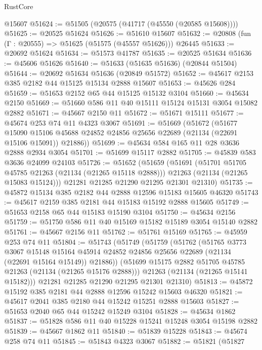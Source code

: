 \begin{lexlean}{RustCore}
\begin{coremodule}
    @15607
@51624 := @51505 (@20575 (@41717 (@45550 (@20585 @15608))))
@51625 := @20525 @51624
@51626 := @51610 @15607
@51632 := @20808 (fun (Γ : @20555) => @51625 (@51575 (@45557 @51626))) @26445
@51633 := @20692 @51624
@51634 := @51573 @41787
@51635 := @20525 @51634
@51636 := @45606 @51626
@51640 := @51633 (@51635 @51636) (@20844 @51504)
@51644 := @20692 @51634 @51636 (@20849 @51572)
@51652 := @45617 @2153 @385 @2182 @44 @15125 @15134 @2888 @15607
@51653 := @45626 @284
@51659 := @51653 @2152 @65 @44 @15125 @15132 @3104
@51660 := @45634 @2150
@51669 := @51660 @586 @11 @40 @15111 @15124 @15131 @3054 @15082 @2882
@51671 := @45667 @2150 @11
@51672 := @51671 @15111
@51677 := @45674 @253 @74 @11 @4323 @3067
@51691 := @51669
    (@51672
      (@51677
        @15090
        @15106
        @45688
        @24852
        @24856
        @25656
        @22689
        (@21134 (@22691 @15106 @15091))
        @21886))
@51699 := @45634 @584 @165 @11 @28 @3636 @2888 @2934 @3054
@51701 := @51699 @15117 @2882
@51705 := @45839 @583 @3636 @24099 @24103
@51726 := @51652
    (@51659
      (@51691
        (@51701 @51705 @45785 @21263 (@21134 (@21265 @15118 @2888)))
        @21263
        (@21134 (@21265 @15083 @15124)))
      @21281
      @21285
      @21290
      @21295
      @21301
      @21310)
@51735 := @45872 @15134 @385 @2182 @44 @2888 @12596 @15183 @15605 @46320
@51743 := @45617 @2159 @385 @2181 @44 @15183 @15192 @2888 @15605
@51749 := @51653 @2158 @65 @44 @15183 @15190 @3104
@51750 := @45634 @2156
@51759 := @51750 @586 @11 @40 @15169 @15182 @15189 @3054 @15140 @2882
@51761 := @45667 @2156 @11
@51762 := @51761 @15169
@51765 := @45959 @253 @74 @11
@51804 := @51743
    (@51749
      (@51759
        (@51762
          (@51765
            @3773
            @3067
            @15148
            @15164
            @45914
            @24852
            @24856
            @25656
            @22689
            (@21134 (@22691 @15164 @15149))
            @21886))
        (@51699 @15175 @2882 @51705 @45785 @21263 (@21134 (@21265 @15176 @2888)))
        @21263
        (@21134 (@21265 @15141 @15182)))
      @21281
      @21285
      @21290
      @21295
      @21301
      @21310)
@51813 := @45872 @15192 @385 @2181 @44 @2888 @12596 @15242 @15603 @46320
@51821 := @45617 @2041 @385 @2180 @44 @15242 @15251 @2888 @15603
@51827 := @51653 @2040 @65 @44 @15242 @15249 @3104
@51828 := @45634 @1862
@51837 := @51828 @586 @11 @40 @15228 @15241 @15248 @3054 @15198 @2882
@51839 := @45667 @1862 @11
@51840 := @51839 @15228
@51843 := @45674 @258 @74 @11
@51845 := @51843 @4323 @3067
@51882 := @51821
    (@51827

\end{coremodule}
\end{lexlean}
